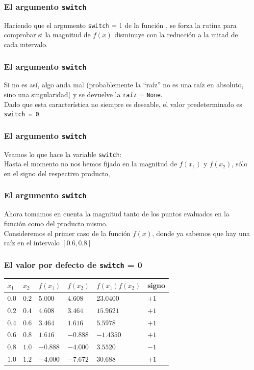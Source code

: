 \begin{frame}
\frametitle{El argumento \texttt{switch}}
Haciendo que el argumento \texttt{switch} = 1 de la función , se forza la rutina para comprobar si la magnitud de $f(x)$ disminuye con la reducción a la mitad de cada intervalo.
\end{frame}
\begin{frame}
\frametitle{El argumento \texttt{switch}}
Si no es así, algo anda mal (probablemente la \enquote{raíz} no es una raíz en absoluto, sino una singularidad) y se devuelve la \texttt{raíz} = \texttt{None}.
\\
\bigskip
Dado que esta característica no siempre es deseable, el valor predeterminado es \texttt{{switch} = 0}.
\end{frame}
\begin{frame}
\frametitle{El argumento \texttt{switch}}
Veamos lo que hace la variable \texttt{switch}:
\\
\medskip
Hasta el momento no nos hemos fijado en la magnitud de $f(x_{1})$ y $f(x_{2})$, sólo en el signo del respectivo producto, 
\end{frame}
\begin{frame}
\frametitle{El argumento \texttt{switch}}
Ahora tomamos en cuenta la magnitud tanto de los puntos evaluados en la función como del producto mismo.
\\
\medskip
Consideremos el primer caso de la función $f(x)$, donde ya sabemos que hay una raíz en el intervalo $[0.6, 0.8]$
\end{frame}
\begin{frame}[fragile]
\frametitle{El valor por defecto de \texttt{switch} = 0}
\begin{tabular}{l | l | l |  l | l | l}
$x_{1}$ & $x_{2}$ & $f(x_{1})$ & $f(x_{2})$ & $f(x_{1})f(x_{2})$ & signo \\ \hline
$0.0$ & $0.2$ & $5.000$ & $4.608$ & $23.0400$ & $+1$ \\ \hline
$0.2$ & $0.4$ & $4.608$ & $3.464$ & $15.9621$ & $+1$ \\ \hline
$0.4$ & $0.6$ & $3.464$ & $1.616$ & $5.5978$ & $+1$ \\ \hline
$0.6$ & $0.8$ & $1.616$ & $-0.888$ & $-1.4350$ & $+1$ \\ \hline
$0.8$ & $1.0$ & $-0.888$ & $-4.000$ & $3.5520$ & $-1$ \\ \hline
$1.0$ & $1.2$ & $-4.000$ & $-7.672$ & $30.688$ & $+1$
\end{tabular}
\end{frame}
